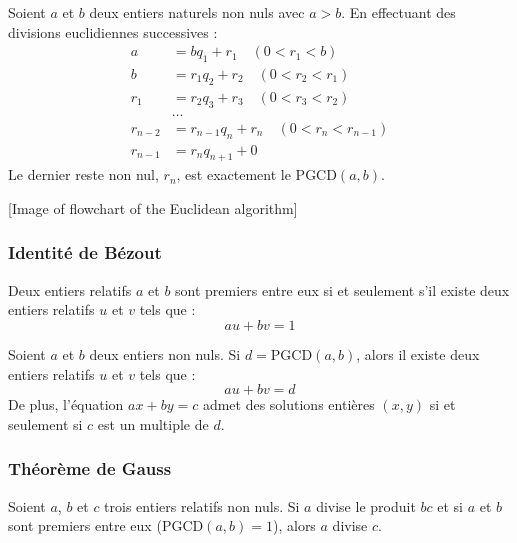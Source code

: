 \begin{theoreme}
Soient $a$ et $b$ deux entiers naturels non nuls avec $a > b$. En effectuant des divisions euclidiennes successives :
\begin{align*}
a &= bq_1 + r_1 \quad (0 < r_1 < b) \\
b &= r_1q_2 + r_2 \quad (0 < r_2 < r_1) \\
r_1 &= r_2q_3 + r_3 \quad (0 < r_3 < r_2) \\
&\dots \\
r_{n-2} &= r_{n-1}q_n + r_n \quad (0 < r_n < r_{n-1}) \\
r_{n-1} &= r_nq_{n+1} + 0
\end{align*}
Le dernier reste non nul, $r_n$, est exactement le $\text{PGCD}(a, b)$.
\end{theoreme}



[Image of flowchart of the Euclidean algorithm]


\subsubsection{Identité de Bézout}

\begin{theoreme}
Deux entiers relatifs $a$ et $b$ sont premiers entre eux si et seulement s'il existe deux entiers relatifs $u$ et $v$ tels que :
$$au + bv = 1$$
\end{theoreme}

\begin{propriete}
Soient $a$ et $b$ deux entiers non nuls. Si $d = \text{PGCD}(a, b)$, alors il existe deux entiers relatifs $u$ et $v$ tels que :
$$au + bv = d$$
De plus, l'équation $ax + by = c$ admet des solutions entières $(x, y)$ si et seulement si $c$ est un multiple de $d$.
\end{propriete}

\subsubsection{Théorème de Gauss}

\begin{theoreme}
Soient $a$, $b$ et $c$ trois entiers relatifs non nuls. 
Si $a$ divise le produit $bc$ et si $a$ et $b$ sont premiers entre eux ($\text{PGCD}(a, b) = 1$), alors $a$ divise $c$.
\end{theoreme}

